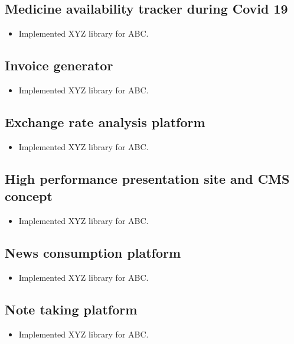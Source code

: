 \documentclass[11pt]{article}
\begin{document}
    \subsection{Medicine availability tracker during Covid 19}
    \begin{itemize}
        \item[\checkmark] Implemented XYZ library for ABC.
    \end{itemize}

    \subsection{Invoice generator}
    \begin{itemize}
        \item[\checkmark] Implemented XYZ library for ABC.
    \end{itemize}

    \subsection{Exchange rate analysis platform}
    \begin{itemize}
        \item[\checkmark] Implemented XYZ library for ABC.
    \end{itemize}

    \subsection{High performance presentation site and CMS concept}
    \begin{itemize}
        \item[\checkmark] Implemented XYZ library for ABC.
    \end{itemize}

    \subsection{News consumption platform}
    \begin{itemize}
        \item[\checkmark] Implemented XYZ library for ABC.
    \end{itemize}

    \subsection{Note taking platform}
    \begin{itemize}
        \item[\checkmark] Implemented XYZ library for ABC.
    \end{itemize}
\end{document}
